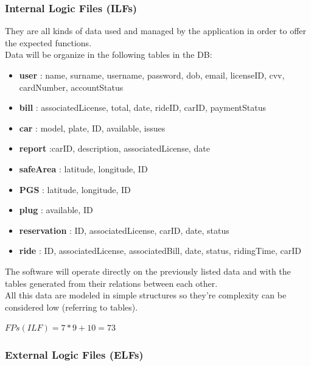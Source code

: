 \documentclass[english]{article}
\begin{document}

\subsubsection{Internal Logic Files (ILFs)}

They are all kinds of data used and managed by the application in  order to offer the expected functions.\\
Data will be organize in the following tables in the DB:
\begin{itemize}
\item \textbf{user} : name, surname, username, password, dob, email, licenseID, cvv, cardNumber, accountStatus

\item \textbf{bill} : associatedLicense, total, date, rideID, carID, paymentStatus

\item \textbf{car} : model, plate, ID, available, issues

\item \textbf{report} :carID, description, associatedLicense, date

\item \textbf{safeArea} : latitude, longitude, ID


\item \textbf{PGS} : latitude, longitude, ID

\item \textbf{plug} : available, ID

\item \textbf{reservation} : ID, associatedLicense, carID, date, status

\item \textbf{ride} : ID, associatedLicense, associatedBill, date, status, ridingTime, carID

\end{itemize}
The software will operate directly on the previously listed data and with the tables generated from their relations between each other.\\
All this data are modeled in simple structures so they're complexity can be considered low (referring to tables).

\begin{center}
$ FPs (ILF) = 7*9+10= 73 $
\end{center}

\subsubsection{External Logic Files (ELFs)}
\end{document}
